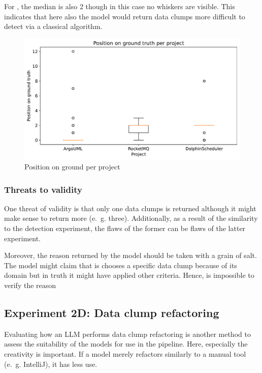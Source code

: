 For \dolphinscheduler, the median is also 2 though in this case no whiskers are visible. This indicates that here also the model would return data clumps more difficult to detect via a classical algorithm. 
\begin{figure}
    \centering
    \includegraphics[width=\columnwidth]{figures/chapter5/filter_project_position_groundtruth.pdf}
    \caption{Position on ground per project}
    \label{fig:filter_project_posgroundtruth}
\end{figure}


\subsubsection{Threats to validity}

One threat of validity is   that only one data clumps is returned although it might make sense to return more (e.~g. three). Additionally, as a result of the similarity to the detection experiment, the flaws of the former can be flaws of the latter experiment. 

Moreover, the reason returned by the model should be taken with a grain of salt. The model might claim that is chooses a specific data clump because of its domain but in truth it might have applied other criteria. Hence,  is impossible to verify the reason


\subsection{Experiment 2D: Data clump refactoring}

Evaluating how an \ac{LLM} performs data clump refactoring is another method to assess the suitability of the models for use in the pipeline. Here, especially the creativity is important. If a model merely refactors similarly to a manual tool (e.~g. IntelliJ), it has less use.

